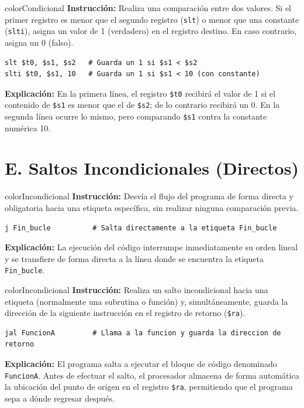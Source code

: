 \documentclass[12pt,a4paper]{article}
\begin{document}
\begin{instructionBox}{colorCondicional}
\textbf{Instrucción:} Realiza una comparación entre dos valores. Si el primer registro es menor que el segundo registro (\texttt{slt}) o menor que una constante (\texttt{slti}), asigna un valor de 1 (verdadero) en el registro destino. En caso contrario, asigna un 0 (falso).
\begin{lstlisting}
slt $t0, $s1, $s2   # Guarda un 1 si $s1 < $s2
slti $t0, $s1, 10   # Guarda un 1 si $s1 < 10 (con constante)
\end{lstlisting}
\textbf{Explicación:} En la primera línea, el registro \texttt{\$t0} recibirá el valor de 1 si el contenido de \texttt{\$s1} es menor que el de \texttt{\$s2}; de lo contrario recibirá un 0. En la segunda línea ocurre lo mismo, pero comparando \texttt{\$s1} contra la constante numérica 10.
\end{instructionBox}

\section*{\textcolor{colorIncondicional}{E. Saltos Incondicionales (Directos)}}

\begin{instructionBox}[25. J (Jump)]{colorIncondicional}
\textbf{Instrucción:} Desvía el flujo del programa de forma directa y obligatoria hacia una etiqueta específica, sin realizar ninguna comparación previa.
\begin{lstlisting}
j Fin_bucle          # Salta directamente a la etiqueta Fin_bucle
\end{lstlisting}
\textbf{Explicación:} La ejecución del código interrumpe inmediatamente su orden lineal y se transfiere de forma directa a la línea donde se encuentra la etiqueta \texttt{Fin\_bucle}.
\end{instructionBox}

\begin{instructionBox}{colorIncondicional}
\textbf{Instrucción:} Realiza un salto incondicional hacia una etiqueta (normalmente una subrutina o función) y, simultáneamente, guarda la dirección de la siguiente instrucción en el registro de retorno (\texttt{\$ra}).
\begin{lstlisting}
jal FuncionA         # Llama a la funcion y guarda la direccion de retorno
\end{lstlisting}
\textbf{Explicación:} El programa salta a ejecutar el bloque de código denominado \texttt{FuncionA}. Antes de efectuar el salto, el procesador almacena de forma automática la ubicación del punto de origen en el registro \texttt{\$ra}, permitiendo que el programa sepa a dónde regresar después.
\end{instructionBox}
\end{document}
